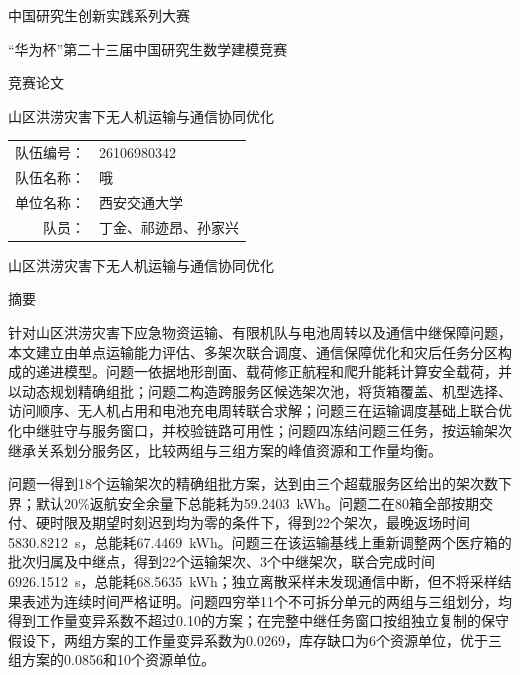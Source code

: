 \documentclass[UTF8,a4paper,zihao=-4]{ctexart}
\newcommand{\papertitle}{山区洪涝灾害下无人机运输与通信协同优化}
\begin{document}
\thispagestyle{empty}
\begin{center}
  {\heiti 中国研究生创新实践系列大赛\par}
  \vspace{0.5em}
  {\heiti “华为杯”第二十三届中国研究生数学建模竞赛\par}
  \vspace{4em}
  {\heiti 竞赛论文\par}
  \vspace{3em}
  {\heiti \papertitle\par}
\end{center}
\vfill
\begin{center}
  \renewcommand{\arraystretch}{1.8}
  \begin{tabular}{rl}
    队伍编号：& 26106980342 \\
    队伍名称：& 哦 \\
    单位名称：& 西安交通大学 \\
    队员：& 丁金、祁迹昂、孙家兴
  \end{tabular}
\end{center}
\vfill
\clearpage

\setcounter{page}{1}
\thispagestyle{fancy}
\begin{center}
  {\heiti \papertitle\par}
  \vspace{1em}
  {\heiti 摘要\par}
\end{center}
\vspace{0.5em}
\noindent{}\songti
针对山区洪涝灾害下应急物资运输、有限机队与电池周转以及通信中继保障问题，本文建立由单点运输能力评估、多架次联合调度、通信保障优化和灾后任务分区构成的递进模型。问题一依据地形剖面、载荷修正航程和爬升能耗计算安全载荷，并以动态规划精确组批；问题二构造跨服务区候选架次池，将货箱覆盖、机型选择、访问顺序、无人机占用和电池充电周转联合求解；问题三在运输调度基础上联合优化中继驻守与服务窗口，并校验链路可用性；问题四冻结问题三任务，按运输架次继承关系划分服务区，比较两组与三组方案的峰值资源和工作量均衡。

问题一得到18个运输架次的精确组批方案，达到由三个超载服务区给出的架次数下界；默认20\%返航安全余量下总能耗为59.2403~kWh。问题二在80箱全部按期交付、硬时限及期望时刻迟到均为零的条件下，得到22个架次，最晚返场时间5830.8212~s，总能耗67.4469~kWh。问题三在该运输基线上重新调整两个医疗箱的批次归属及中继点，得到22个运输架次、3个中继架次，联合完成时间6926.1512~s，总能耗68.5635~kWh；独立离散采样未发现通信中断，但不将采样结果表述为连续时间严格证明。问题四穷举11个不可拆分单元的两组与三组划分，均得到工作量变异系数不超过0.10的方案；在完整中继任务窗口按组独立复制的保守假设下，两组方案的工作量变异系数为0.0269，库存缺口为6个资源单位，优于三组方案的0.0856和10个资源单位。
\end{document}
